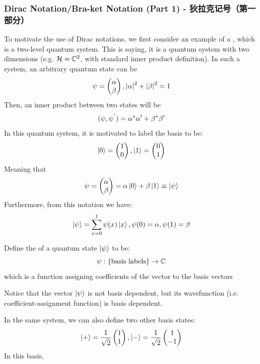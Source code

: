 \subsubsection{Dirac Notation/Bra-ket Notation (Part 1) - 狄拉克记号（第一部分）}
To motivate the use of Dirac notations, we first consider an example of a , which is a two-level quantum system. This is saying, it is a quantum system with two dimensions (e.g. $\mathcal{H} = \mathbb{C}^2$, with standard inner product definition). In such a system, an arbitrary quantum state can be
$$\psi = \begin{pmatrix} \alpha \\ \beta \end{pmatrix}, \abs{\alpha}^2 + \abs{\beta}^2 = 1$$
Then, an inner product between two states will be
$$(\psi, \psi^{'}) = \alpha^{*}\alpha' + \beta^{*}\beta'$$
In this quantum system, it is motivated to label the basis to be:
$$\ket{0} = \begin{pmatrix}
    1 \\ 0
\end{pmatrix}, \ket{1} = \begin{pmatrix}
    0 \\ 1
\end{pmatrix}$$
Meaning that
$$\psi = \begin{pmatrix}
    \alpha \\ \beta
\end{pmatrix} = \alpha \ket{0} + \beta \ket{1} \equiv \ket{\psi}$$
Furthermore, from this notation we have:
$$\ket{\psi} = \sum_{x = 0}^{1} \psi(x)\ket{x}, \psi(0) = \alpha, \psi(1) = \beta$$
\begin{definition}
    Define the  of a quantum state $\ket{\psi}$ to be:
    $$\psi: \{\text{basis labels}\} \to \mathbb{C}$$
    which is a function assigning coefficients of the vector to the basis vectors
\end{definition}
Notice that the vector $\ket{\psi}$ is not basis dependent, but its wavefunction (i.e. coefficient-assignment function) is basis dependent. \par
In the same system, we can also define two other basis states:
$$\ket{+} = \frac{1}{\sqrt{2}}\begin{pmatrix}
    1 \\ 1
\end{pmatrix}, \ket{-} = \frac{1}{\sqrt{2}}\begin{pmatrix}
    1 \\ -1
\end{pmatrix}$$
In this basis,

